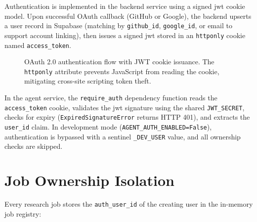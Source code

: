 \documentclass[12pt,a4paper,oneside]{book}
\begin{document}
Authentication is implemented in the backend service using a signed \gls{jwt} cookie model. Upon successful OAuth callback (GitHub or Google), the backend upserts a user record in Supabase (matching by \texttt{github\_id}, \texttt{google\_id}, or email to support account linking), then issues a signed \gls{jwt} stored in an \texttt{httponly} cookie named \texttt{access\_token}.

\begin{figure}[H]
\centering
{}
\caption{OAuth 2.0 authentication flow with JWT cookie issuance. The \texttt{httponly} attribute prevents JavaScript from reading the cookie, mitigating cross-site scripting token theft.}
\label{fig:auth_flow}
\end{figure}

In the agent service, the \texttt{require\_auth} dependency function reads the \texttt{access\_token} cookie, validates the \gls{jwt} signature using the shared \texttt{JWT\_SECRET}, checks for expiry (\texttt{ExpiredSignatureError} returns HTTP 401), and extracts the \texttt{user\_id} claim. In development mode (\texttt{AGENT\_AUTH\_ENABLED=False}), authentication is bypassed with a sentinel \texttt{\_DEV\_USER} value, and all ownership checks are skipped.

\section{Job Ownership Isolation}

Every research job stores the \texttt{auth\_user\_id} of the creating user in the in-memory job registry:
\end{document}

